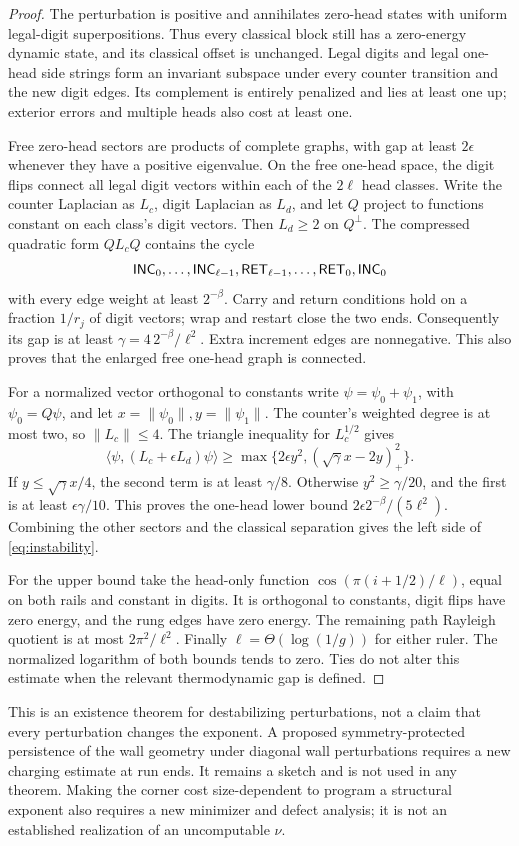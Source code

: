 \begin{proof}
The perturbation is positive and annihilates zero-head states with
uniform legal-digit superpositions. Thus every classical block
still has a zero-energy dynamic state, and its classical offset
is unchanged. Legal digits and legal one-head side strings form an
invariant subspace under every counter transition and the new digit
edges. Its complement is entirely penalized and lies at least one
up; exterior errors and multiple heads also cost at least one.

Free zero-head sectors are products of complete graphs, with gap
at least $2\epsilon$ whenever they have a positive eigenvalue.
On the free one-head space, the digit flips connect all legal
digit vectors within each of the $2\ell$ head classes. Write the
counter Laplacian as $L_c$, digit Laplacian as $L_d$, and let $Q$
project to functions constant on each class's digit vectors.
Then $L_d\geq2$ on $Q^\perp$. The compressed quadratic form
$QL_cQ$ contains the cycle
\[
 \mathsf{INC}_0,\ldots,\mathsf{INC}_{\ell-1},
 \mathsf{RET}_{\ell-1},\ldots,\mathsf{RET}_0,\mathsf{INC}_0
\]
with every edge weight at least $2^{-\beta}$. Carry and return
conditions hold on a fraction $1/r_j$ of digit vectors; wrap and
restart close the two ends. Consequently its gap is at least
$\gamma=4\,2^{-\beta}/\ell^2$. Extra increment edges are nonnegative.
This also proves that the enlarged free one-head graph is connected.

For a normalized vector orthogonal to constants write
$\psi=\psi_0+\psi_1$, with $\psi_0=Q\psi$, and let
$x=\|\psi_0\|,y=\|\psi_1\|$. The counter's weighted degree is at
most two, so $\|L_c\|\leq4$. The triangle inequality for
$L_c^{1/2}$ gives
\[
 \langle\psi,(L_c+\epsilon L_d)\psi\rangle
 \geq\max\{2\epsilon y^2,(\sqrt\gamma x-2y)_+^2\}.
\]
If $y\leq\sqrt\gamma x/4$, the second term is at least
$\gamma/8$. Otherwise $y^2\geq\gamma/20$, and the first is
at least $\epsilon\gamma/10$. This proves the one-head lower
bound $2\epsilon2^{-\beta}/(5\ell^2)$. Combining the other
sectors and the classical separation gives the left side of
\eqref{eq:instability}.

For the upper bound take the head-only function
$\cos(\pi(i+1/2)/\ell)$, equal on both rails and constant in
digits. It is orthogonal to constants, digit flips have zero
energy, and the rung edges have zero energy. The remaining path
Rayleigh quotient is at most $2\pi^2/\ell^2$.
Finally $\ell=\Theta(\log(1/g))$ for either ruler. The normalized
logarithm of both bounds tends to zero. Ties do not alter this
estimate when the relevant thermodynamic gap is defined.
\end{proof}

This is an existence theorem for destabilizing perturbations, not a
claim that every perturbation changes the exponent. A proposed
symmetry-protected persistence of the wall geometry under diagonal
wall perturbations requires a new charging estimate at run ends.
It remains a sketch and is not used in any theorem. Making the
corner cost size-dependent to program a structural exponent also
requires a new minimizer and defect analysis; it is not an
established realization of an uncomputable $\nu$.
